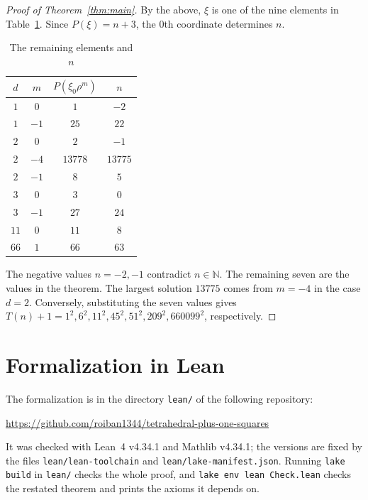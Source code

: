 \documentclass[a4paper,11pt]{article}
\theoremstyle{plain}
\theoremstyle{definition}
\theoremstyle{remark}
\numberwithin{equation}{section}
\numberwithin{table}{section}
\newcommand{\N}{\mathbb{N}}
\begin{document}
\begin{proof}[Proof of Theorem~\ref{thm:main}]
By the above, $\xi$ is one of the nine elements in Table~\ref{tab:values}.
Since $P(\xi)=n+3$, the $0$th coordinate determines $n$.

\begin{table}[htbp]
\centering
\caption{The remaining elements and $n$}\label{tab:values}
\begin{tabular}{cccc}
\toprule
$d$ & $m$ & $P(\xi_0\rho^m)$ & $n$\\
\midrule
$1$ & $0$ & $1$ & $-2$\\
$1$ & $-1$ & $25$ & $22$\\
$2$ & $0$ & $2$ & $-1$\\
$2$ & $-4$ & $13778$ & $13775$\\
$2$ & $-1$ & $8$ & $5$\\
$3$ & $0$ & $3$ & $0$\\
$3$ & $-1$ & $27$ & $24$\\
$11$ & $0$ & $11$ & $8$\\
$66$ & $1$ & $66$ & $63$\\
\bottomrule
\end{tabular}
\end{table}

The negative values $n=-2,-1$ contradict $n\in\N$. The remaining seven are the values in the theorem. The largest solution $13775$ comes from $m=-4$ in the case $d=2$.
Conversely, substituting the seven values gives $T(n)+1=1^2,6^2,11^2,45^2,51^2,209^2,660099^2$, respectively.
\end{proof}


\appendix
\section{Formalization in Lean}\label{app:lean}

The formalization is in the directory \texttt{lean/} of the following repository:
\begin{center}
\url{https://github.com/roiban1344/tetrahedral-plus-one-squares}
\end{center}
It was checked with Lean~4 v4.34.1 and Mathlib v4.34.1; the versions are fixed by the files \texttt{lean/lean-toolchain} and \texttt{lean/lake-manifest.json}.
Running \texttt{lake build} in \texttt{lean/} checks the whole proof, and \texttt{lake env lean Check.lean} checks the restated theorem and prints the axioms it depends on.
\end{document}
